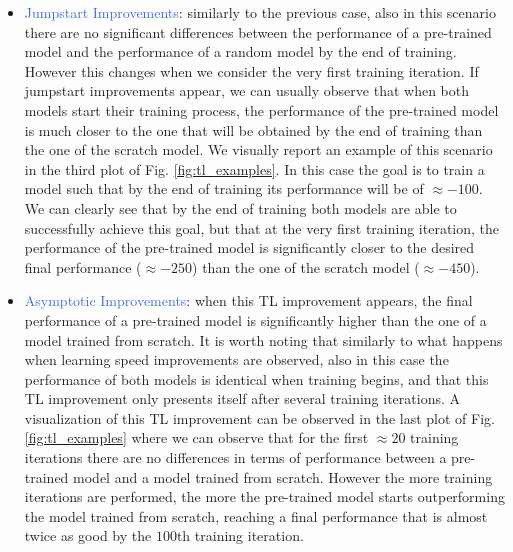 \begin{itemize}
	\item \textcolor{RoyalBlue}{Jumpstart Improvements}: similarly to the previous case, also in this scenario there are no significant differences between the performance of a pre-trained model and the performance of a random model by the end of training. However this changes when we consider the very first training iteration. If jumpstart improvements appear, we can usually observe that when both models start their training process, the performance of the pre-trained model is much closer to the one that will be obtained by the end of training than the one of the scratch model. We visually report an example of this scenario in the third plot of Fig. \ref{fig:tl_examples}. In this case the goal is to train a model such that by the end of training its performance will be of $\approx -100$. We can clearly see that by the end of training both models are able to successfully achieve this goal, but that at the very first training iteration, the performance of the pre-trained model is significantly closer to the desired final performance ($\approx -250$) than the one of the scratch model ($\approx -450$). 
	\item \textcolor{RoyalBlue}{Asymptotic Improvements}: when this TL improvement appears, the final performance of a pre-trained model is significantly higher than the one of a model trained from scratch. It is worth noting that similarly to what happens when learning speed improvements are observed, also in this case the performance of both models is identical when training begins, and that this TL improvement only presents itself after several training iterations. A visualization of this TL improvement can be observed in the last plot of Fig. \ref{fig:tl_examples} where we can observe that for the first $\approx 20$ training iterations there are no differences in terms of performance between a pre-trained model and a model trained from scratch. However the more training iterations are performed, the more the pre-trained model starts outperforming the model trained from scratch, reaching a final performance that is almost twice as good by the $100\text{th}$ training iteration.
\end{itemize}



